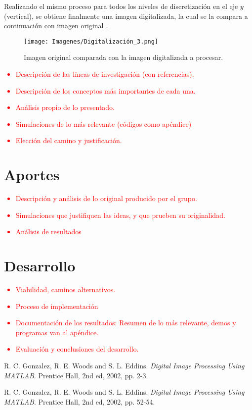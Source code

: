 Realizando el mismo proceso para todos los niveles de discretización en el eje $y$ (vertical), se obtiene finalmente una imagen digitalizada, la cual se la compara a continuación con imagen original \cite{ref:digit1}.
\begin{figure}[H]
\centering
	\texttt{[image: Imagenes/Digitalización\_3.png]}
	\caption{Imagen original comparada con la imagen digitalizada a procesar.}
	\label{fig:disc3}
\end{figure}

\textcolor{red}{
\begin{itemize}
	\item Descripción de las líneas de investigación (con referencias).
	\item Descripción de los conceptos más importantes de cada una.
	\item Análisis propio de lo presentado.
	\item Simulaciones de lo más relevante (códigos como apéndice)
	\item Elección del camino y justificación.
\end{itemize}
}

\section{Aportes}
\textcolor{red}{
\begin{itemize}
	\item Descripción y análisis de lo original producido por el grupo.
	\item Simulaciones que justifiquen las ideas, y que prueben su originalidad.
	\item Análisis de resultados
\end{itemize}
}

\section{Desarrollo}
\textcolor{red}{
\begin{itemize}
	\item Viabilidad, caminos alternativos.
	\item Proceso de implementación
	\item Documentación de los resultados: Resumen de lo más relevante, demos y programas van al apéndice.
	\item Evaluación y conclusiones del desarrollo.
\end{itemize}
}

\begin{thebibliography}{9}
R. C. Gonzalez, R. E. Woods and S. L. Eddins. \textit{Digital Image Processing Using MATLAB}. Prentice Hall, 2nd ed, 2002, pp. 2-3.

R. C. Gonzalez, R. E. Woods and S. L. Eddins. \textit{Digital Image Processing Using MATLAB}. Prentice Hall, 2nd ed, 2002, pp. 52-54.
\end{thebibliography}


